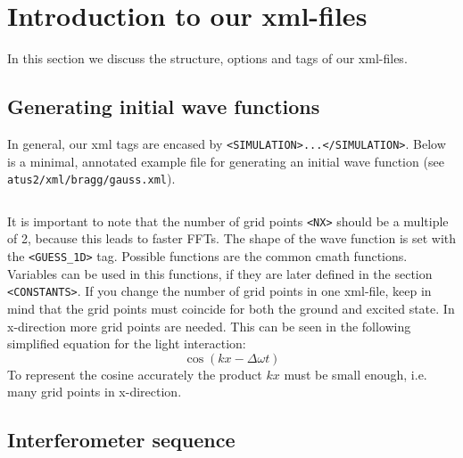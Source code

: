 \documentclass[12pt]{article}
\begin{document}
\section{Introduction to our xml-files}
\label{sec:introduction_to_xml_files}
In this section we discuss the structure, options and tags of our xml-files.

\subsection{Generating initial wave functions}
\label{sub:generating_initial_wave_functions}

In general, our xml tags are encased by 
\texttt{<SIMULATION>...</SIMULATION>}.
Below is a minimal, annotated example file for generating an initial wave function
(see \texttt{atus2/xml/bragg/gauss.xml}).
\inputminted{xml}{gauss.xml} \noindent 
It is important to note that the number of grid points \texttt{<NX>} 
should be a multiple of 2, because this leads to faster FFTs.
The shape of the wave function is set with the \texttt{<GUESS_1D>} tag. 
Possible functions are the common cmath functions. 
Variables can be used in this functions, if they are later defined in the section 
\texttt{<CONSTANTS>}.
If you change the number of grid points in one xml-file, keep in mind that the
grid points must coincide for both the ground and excited state.
In x-direction more grid points are needed.
This can be seen in the following simplified equation for the light interaction:
\begin{equation}
  \cos(kx-\Delta \omega t)
\end{equation}
To represent the cosine accurately the product $kx$ must be small enough, i.e.
many grid points in x-direction.


\subsection{Interferometer sequence}
\label{sub:interferometer_sequence}
\end{document}

